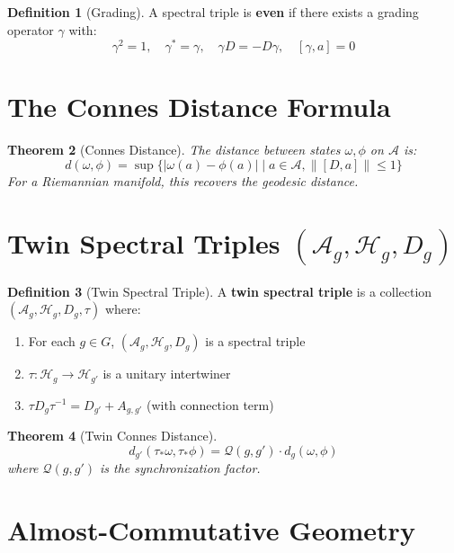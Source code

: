 \documentclass[11pt,a4paper,openright]{book}
\theoremstyle{plain}
\newtheorem{theorem}{Theorem}[chapter]
\theoremstyle{definition}
\newtheorem{definition}[theorem]{Definition}
\newcommand{\Hil}{\mathcal{H}}
\newcommand{\A}{\mathcal{A}}
\begin{document}
\begin{definition}[Grading]
A spectral triple is \textbf{even} if there exists a grading operator $\gamma$ with:
\begin{equation}
\gamma^2 = 1, \quad \gamma^* = \gamma, \quad \gamma D = -D\gamma, \quad [\gamma, a] = 0
\end{equation}
\end{definition}

\section{The Connes Distance Formula}

\begin{theorem}[Connes Distance]
The distance between states $\omega, \phi$ on $\A$ is:
\begin{equation}
d(\omega, \phi) = \sup\{|\omega(a) - \phi(a)| \mid a \in \A, \|[D, a]\| \leq 1\}
\end{equation}
For a Riemannian manifold, this recovers the geodesic distance.
\end{theorem}

\section{Twin Spectral Triples $(\A_g, \Hil_g, D_g)$}

\begin{definition}[Twin Spectral Triple]
A \textbf{twin spectral triple} is a collection $(\A_g, \Hil_g, D_g, \tau)$ where:
\begin{enumerate}[label=(\roman*)]
    \item For each $g \in G$, $(\A_g, \Hil_g, D_g)$ is a spectral triple
    \item $\tau: \Hil_g \to \Hil_{g'}$ is a unitary intertwiner
    \item $\tau D_g \tau^{-1} = D_{g'} + A_{g,g'}$ (with connection term)
\end{enumerate}
\end{definition}

\begin{theorem}[Twin Connes Distance]
\begin{equation}
d_{g'}(\tau_*\omega, \tau_*\phi) = \mathcal{Q}(g, g') \cdot d_g(\omega, \phi)
\end{equation}
where $\mathcal{Q}(g, g')$ is the synchronization factor.
\end{theorem}

\section{Almost-Commutative Geometry}
\end{document}
